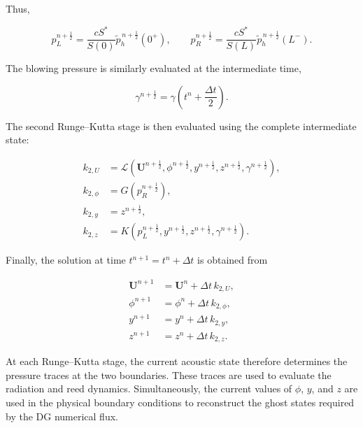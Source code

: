 \documentclass[11pt,a4paper]{report}
\theoremstyle{plain}
\theoremstyle{definition}
\begin{document}
Thus,

\begin{equation}
p_L^{n+\frac12}
=
\frac{cS^\ast}{S(0)}
\tilde p_h^{\,n+\frac12}(0^+),
\qquad
p_R^{n+\frac12}
=
\frac{cS^\ast}{S(L)}
\tilde p_h^{\,n+\frac12}(L^-).
\label{eq:pressure_stage2}
\end{equation}

The blowing pressure is similarly evaluated at the intermediate time,

\begin{equation}
\gamma^{n+\frac12}
=
\gamma
\left(
t^n+\frac{\Delta t}{2}
\right).
\end{equation}

The second Runge--Kutta stage is then evaluated using the complete
intermediate state:

\begin{subequations}
\label{eq:rk2_stage2}
\begin{align}
k_{2,U}
&=
\mathcal L
\left(
\mathbf U^{n+\frac12},
\phi^{n+\frac12},
y^{n+\frac12},
z^{n+\frac12},
\gamma^{n+\frac12}
\right),
\\
k_{2,\phi}
&=
G
\left(
p_R^{n+\frac12}
\right),
\\
k_{2,y}
&=
z^{n+\frac12},
\\
k_{2,z}
&=
K
\left(
p_L^{n+\frac12},
y^{n+\frac12},
z^{n+\frac12},
\gamma^{n+\frac12}
\right).
\end{align}
\end{subequations}

Finally, the solution at time
\(t^{n+1}=t^n+\Delta t\) is obtained from

\begin{subequations}
\label{eq:rk2_final_update}
\begin{align}
\mathbf U^{n+1}
&=
\mathbf U^n
+
\Delta t\,k_{2,U},
\\
\phi^{n+1}
&=
\phi^n
+
\Delta t\,k_{2,\phi},
\\
y^{n+1}
&=
y^n
+
\Delta t\,k_{2,y},
\\
z^{n+1}
&=
z^n
+
\Delta t\,k_{2,z}.
\end{align}
\end{subequations}

At each Runge--Kutta stage, the current acoustic state therefore determines
the pressure traces at the two boundaries. These traces are used to evaluate
the radiation and reed dynamics. Simultaneously, the current values of
\(\phi\), \(y\), and \(z\) are used in the physical boundary conditions to
reconstruct the ghost states required by the DG numerical flux.
\end{document}
